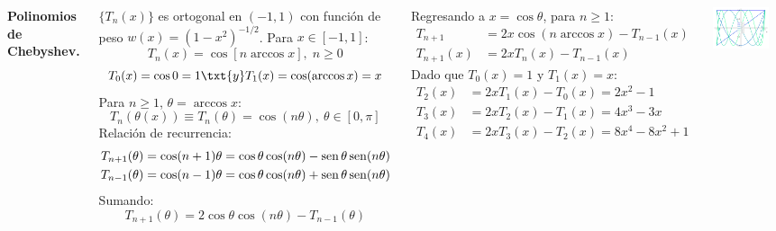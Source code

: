 \documentclass[9pt, aspectratio=169]{beamer}
\begin{document}
\begin{frame}
\begin{columns}[t]
\cx
\textbf{Polinomios de Chebyshev.}

$\{ T_n(x)\}$ es ortogonal en $(-1, 1)$ con función de peso $w(x) = (1-x^2)^{-1/2}$. Para $x \in [-1, 1]$:
\[ T_n(x) = \cos[n \arccos x], \; n \geq 0 \] \pause \vspace{-2em}
\[ T_0(x) = \cos 0 = 1 \txt{y} T_1(x) =\cos(\arccos x) = x \] \pause
Para $n \geq 1$, $\theta = \arccos x$:
\[ T_n(\theta(x)) \equiv T_n(\theta) = \cos (n \theta), \: \theta \in [0, \pi] \]
Relación de recurrencia:
\begin{align*}
T_{n+1}(\theta) &= \cos(n+1) \theta = \cos \theta \cos(n \theta) - \operatorname{sen} \theta \operatorname{sen} (n \theta) \\
T_{n-1}(\theta) &= \cos(n-1) \theta =  \cos \theta \cos(n \theta) + \operatorname{sen} \theta \operatorname{sen} (n \theta) 
\end{align*}
Sumando: 
\[ T_{n+1}(\theta) = 2 \cos \theta \cos(n \theta) - T_{n-1}(\theta) \] \pause

\cx
Regresando a $x = \cos \theta$, para $n \geq 1$:
\begin{align*}
    T_{n+1} &= 2 x \cos(n \arccos x) - T_{n-1}(x) \\
    T_{n+1}(x) &= 2 x T_n(x) - T_{n-1}(x)
\end{align*} \pause
Dado que $T_0(x) = 1$ y $T_1(x) = x$:
\begin{align*}
T_2(x) &= 2 x T_1(x) - T_0(x) = 2 x^2 -1 \\
T_3(x) &= 2 x T_2(x) - T_1(x) = 4 x^3 - 3 x \\
T_4(x) &= 2 x T_3(x) - T_2(x) = 8 x^4 - 8 x^2 + 1
\end{align*}

\begin{center}
    \includegraphics[width=0.8\textwidth]{figs/fig-06.pdf}
\end{center}
\end{columns}
\end{frame}
\end{document}
